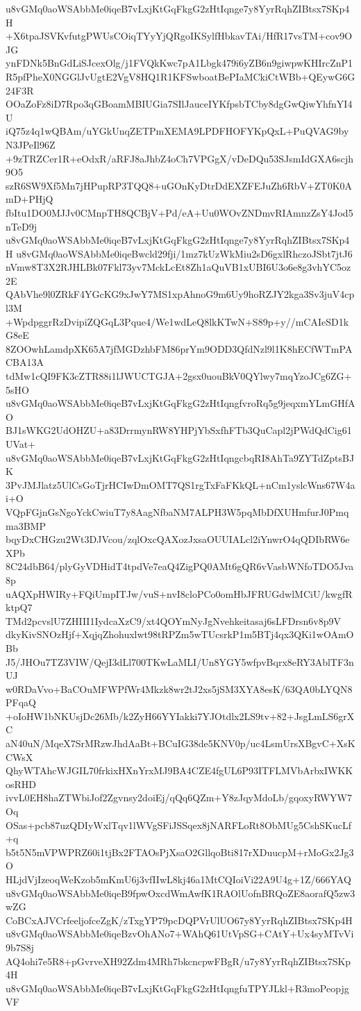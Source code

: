 u8vGMq0aoWSAbbMe0iqeB7vLxjKtGqFkgG2zHtIqnge7y8YyrRqhZIBtsx7SKp4H
+X6tpaJSVKvfutgPWUsCOiqTYyYjQRgoIKSylfHbkavTAi/HfR17vsTM+cov9OJG
ynFDNk5BnGdLiSJcexOlg/j1FVQkKwc7pA1Lbgk479i6yZB6n9giwpwKHIrcZnP1
R5pfPheX0NGGlJvUgtE2VgV8HQ1R1KFSwboatBePIaMCkiCtWBb+QEywG6G24F3R
OOaZoFz8iD7Rpo3qGBoamMBIUGia7SIlJauceIYKfpsbTCby8dgGwQiwYhfnYI4U
iQ75z4q1wQBAm/uYGkUnqZETPmXEMA9LPDFHOFYKpQxL+PuQVAG9byN3JPeIl96Z
+9zTRZCer1R+eOdxR/aRFJ8aJhbZ4oCh7VPGgX/vDeDQu53SJsmIdGXA6scjh9O5
szR6SW9Xf5Mn7jHPupRP3TQQ8+uGOnKyDtrDdEXZFEJuZh6RbV+ZT0K0AmD+PHjQ
fbItu1DO0MJJv0CMnpTH8QCBjV+Pd/eA+Uu0WOvZNDmvRIAmnzZsY4Jod5nTeD9j
u8vGMq0aoWSAbbMe0iqeB7vLxjKtGqFkgG2zHtIqnge7y8YyrRqhZIBtsx7SKp4H
u8vGMq0aoWSAbbMe0iqeBwcld29fji/1mz7kUzWkMiu2sD6gxlRhczoJSbt7jtJ6
nVmw8T3X2RJHLBk07Fkl73yv7MckLcEt8Zh1aQuVB1xUBI6U3o6e8g3vhYC5oz2E
QAbVhe9l0ZRkF4YGcKG9xJwY7MS1xpAhnoG9m6Uy9hoRZJY2kga3Sv3juV4cpl3M
+WpdpggrRzDvipiZQGqL3Pque4/We1wdLeQ8lkKTwN+S89p+y//mCAIeSD1kG8eE
8ZOOwhLamdpXK65A7jfMGDzhbFM86prYm9ODD3QfdNzl9l1K8hECfWTmPACBA13A
tdMw1cQI9FK3cZTR88i1lJWUCTGJA+2gsx0uouBkV0QYlwy7mqYzoJCg6ZG+5sHO
u8vGMq0aoWSAbbMe0iqeB7vLxjKtGqFkgG2zHtIqngfvroRq5g9jeqxmYLmGHfAO
BJ1sWKG2UdOHZU+a83DrrmynRW8YHPjYbSxfhFTb3QuCapl2jPWdQdCig61UVat+
u8vGMq0aoWSAbbMe0iqeB7vLxjKtGqFkgG2zHtIqngcbqRI8AhTa9ZYTdZptsBJK
3PvJMJlatz5UlCsGoTjrHCIwDmOMT7QS1rgTxFaFKkQL+nCm1yslcWns67W4ai+O
VQpFGjnGsNgoYckCwiuT7y8AagNfbaNM7ALPH3W5pqMbDfXUHmfurJ0Pmqma3BMP
bqyDxCHGzu2Wt3DJVcou/zqlOxcQAXozJxsaOUUIALcl2iYnwrO4qQDIbRW6eXPb
8C24dbB64/plyGyVDHidT4tpdVe7eaQ4ZigPQ0AMt6gQR6vVasbWNfoTDO5Jva8p
uAQXpHWIRy+FQiUmpITJw/vuS+nvI8cloPCo0omHbJFRUGdwlMCiU/kwgfRktpQ7
TMd2pcvslU7ZHIII1IydcaXzC9/xt4QOYmNyJgNvehkeitasaj6sLFDrsn6v8p9V
dkyKivSNOzHjf+XqjqZhohuxlwt98tRPZm5wTUcsrkP1m5BTj4qx3QKi1wOAmOBb
J5/JHOu7TZ3VIW/QejI3dLl700TKwLaMLI/Un8YGY5wfpvBqrx8eRY3AblTF3nUJ
w0RDaVvo+BaCOuMFWPfWr4Mkzk8wr2tJ2xs5jSM3XYA8esK/63QA0bLYQN8PFqaQ
+oIoHW1bNKUsjDc26Mb/k2ZyH66YYIakki7YJOtdlx2LS9tv+82+JsgLmLS6grXC
aN40uN/MqeX7SrMRzwJhdAaBt+BCuIG38de5KNV0p/uc4LsmUrsXBgvC+XsKCWsX
QhyWTAhcWJGIL70frkixHXnYrxMJ9BA4CZE4fgUL6P93ITFLMVbArbxIWKKosRHD
ivvL0EH8haZTWbiJof2Zgvnsy2doiEj/qQq6QZm+Y8zJqyMdoLb/gqoxyRWYW7Oq
OSas+pcb87uzQDIyWxlTqv1lWVgSFiJSSqex8jNARFLoRt8ObMUg5CshSKucLf+q
b5t5N5mVPWPRZ60i1tjBx2FTAOsPjXsaO2GllqoBti817rXDuucpM+rMoGx2Jg3O
HLjdVjIzeoqWeKzob5mKmU6j3vfIIwL8kj46a1MtCQIoiVi22A9U4g+1Z/666YAQ
u8vGMq0aoWSAbbMe0iqeB9fpwOxcdWmAwfK1RAOlUofnBRQoZE8aorafQ5zw3wZG
CoBCxAJVCrfeeljofceZgK/zTxgYP79pcDQPVrUlUO67y8YyrRqhZIBtsx7SKp4H
u8vGMq0aoWSAbbMe0iqeBzvOhANo7+WAhQ61UtVpSG+CAtY+Ux4syMTvVi9b7S8j
AQ4ohi7e5R8+pGvrveXH92Zdm4MRh7bkcncpwFBgR/u7y8YyrRqhZIBtsx7SKp4H
u8vGMq0aoWSAbbMe0iqeB7vLxjKtGqFkgG2zHtIqngfuTPYJLkl+R3moPeopjgVF
